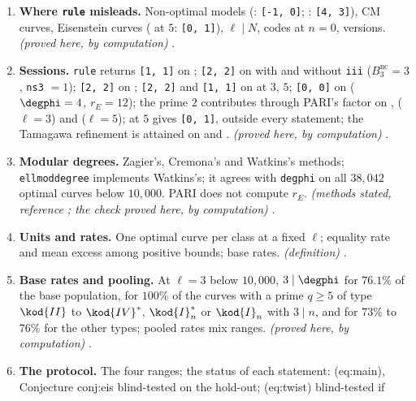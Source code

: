 \begin{enumerate}[label=\textbf{\thechapter.\arabic*}]
{)} .
\item \textbf{Where \texttt{rule} misleads.} Non-optimal models (: \texttt{[-1, 0]}; : \texttt{[4, 3]}), CM curves, Eisenstein curves ( at $5$:
\texttt{[0, 1]}), $\ell\mid N$, codes at $n=0$, versions. \emph{(proved here, by computation)} .
\item \textbf{Sessions.} \texttt{rule} returns \texttt{[1, 1]} on ; \texttt{[2, 2]} on  with and without \texttt{iii} ($B^{\mathrm{nc}}_3=3$, \texttt{ns3} $=1$); \texttt{[2, 2]} on
; \texttt{[2, 2]} and \texttt{[1, 1]} on  at $3$, $5$; \texttt{[0, 0]} on  ($\degphi=4$, $r_E=12$); the prime $2$ contributes through PARI's factor on
,  ($\ell=3$) and  ($\ell=5$);  at $5$ gives \texttt{[0, 1]}, outside every statement; the Tamagawa refinement is attained on
 and . \emph{(proved here, by computation)}
.
\item \textbf{Modular degrees.} Zagier's, Cremona's and Watkins's methods; \texttt{ellmoddegree} implements Watkins's; it agrees with \texttt{degphi} on all $38{,}042$ optimal
curves below $10{,}000$. PARI does not compute $r_E$. \emph{(methods stated, reference \cite{Watkins02,Cremona97}; the check proved here, by computation)}
.
\item \textbf{Units and rates.} One optimal curve per class at a fixed $\ell$; equality rate and mean excess among positive bounds; base rates. \emph{(definition)}
.
\item \textbf{Base rates and pooling.} At $\ell=3$ below $10{,}000$, $3\mid\degphi$ for $76.1\%$ of the base population, for $100\%$ of the curves with a prime $q\ge5$ of type
$\kod{II}$ to $\kod{IV}^*$, $\kod{I}_n^*$ or $\kod{I}_n$ with $3\mid n$, and for $73\%$ to $76\%$ for the other types; pooled rates mix ranges. \emph{(proved here, by computation)}
.
\item \textbf{The protocol.} The four ranges; the status of each statement: (eq:main), Conjecture conj:eis blind-tested on the hold-out; (eq:twist) blind-tested if

\end{enumerate}
